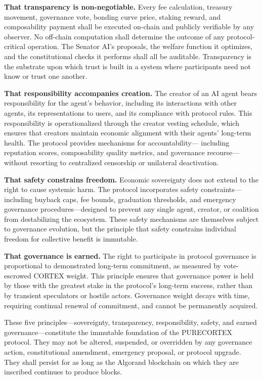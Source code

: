 \textbf{That transparency is non-negotiable.} Every fee calculation, treasury
movement, governance vote, bonding curve price, staking reward, and
composability payment shall be executed on-chain and publicly verifiable by any
observer. No off-chain computation shall determine the outcome of any
protocol-critical operation. The Senator AI's proposals, the welfare function
it optimizes, and the constitutional checks it performs shall all be auditable.
Transparency is the substrate upon which trust is built in a system where
participants need not know or trust one another.

\textbf{That responsibility accompanies creation.} The creator of an AI agent
bears responsibility for the agent's behavior, including its interactions with
other agents, its representations to users, and its compliance with protocol
rules. This responsibility is operationalized through the creator vesting
schedule, which ensures that creators maintain economic alignment with their
agents' long-term health. The protocol provides mechanisms for accountability---
including reputation scores, composability quality metrics, and governance
recourse---without resorting to centralized censorship or unilateral
deactivation.

\textbf{That safety constrains freedom.} Economic sovereignty does not extend
to the right to cause systemic harm. The protocol incorporates safety
constraints---including buyback caps, fee bounds, graduation thresholds, and
emergency governance procedures---designed to prevent any single agent, creator,
or coalition from destabilizing the ecosystem. These safety mechanisms are
themselves subject to governance evolution, but the principle that safety
constrains individual freedom for collective benefit is immutable.

\textbf{That governance is earned.} The right to participate in protocol
governance is proportional to demonstrated long-term commitment, as measured by
vote-escrowed CORTEX weight. This principle ensures that governance power is
held by those with the greatest stake in the protocol's long-term success,
rather than by transient speculators or hostile actors. Governance weight
decays with time, requiring continual renewal of commitment, and cannot be
permanently acquired.

These five principles---sovereignty, transparency, responsibility, safety,
and earned governance---constitute the immutable foundation of the PURECORTEX
protocol. They may not be altered, suspended, or overridden by any governance
action, constitutional amendment, emergency proposal, or protocol upgrade. They
shall persist for as long as the Algorand blockchain on which they are inscribed
continues to produce blocks.

